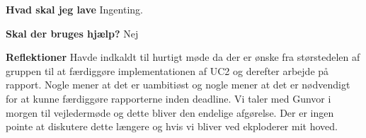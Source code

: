 \documentclass{article}
\begin{document}
	\textbf{Hvad skal jeg lave}
	Ingenting.
	
	\textbf{Skal der bruges hjælp?}
	Nej
	
	\textbf{Reflektioner}
	Havde indkaldt til hurtigt møde da der er ønske fra størstedelen af gruppen til at færdiggøre implementationen af UC2 og derefter arbejde på rapport. Nogle mener at det er uambitiøst og nogle mener at det er nødvendigt for at kunne færdiggøre rapporterne inden deadline. Vi taler med Gunvor i morgen til vejledermøde og dette bliver den endelige afgørelse. Der er ingen pointe at diskutere dette længere og hvis vi bliver ved ekploderer mit hoved.
	
\end{document}

